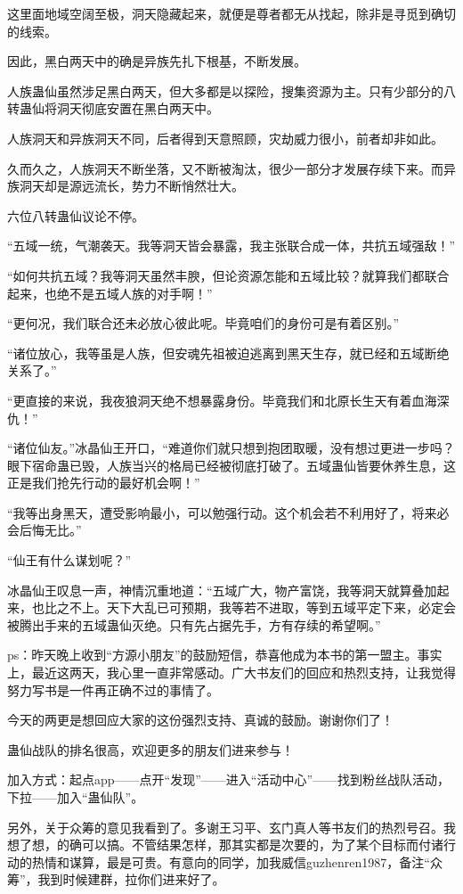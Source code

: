 \begin{this_body}
这里面地域空阔至极，洞天隐藏起来，就便是尊者都无从找起，除非是寻觅到确切的线索。

因此，黑白两天中的确是异族先扎下根基，不断发展。

人族蛊仙虽然涉足黑白两天，但大多都是以探险，搜集资源为主。只有少部分的八转蛊仙将洞天彻底安置在黑白两天中。

人族洞天和异族洞天不同，后者得到天意照顾，灾劫威力很小，前者却非如此。

久而久之，人族洞天不断坐落，又不断被淘汰，很少一部分才发展存续下来。而异族洞天却是源远流长，势力不断悄然壮大。

六位八转蛊仙议论不停。

“五域一统，气潮袭天。我等洞天皆会暴露，我主张联合成一体，共抗五域强敌！”

“如何共抗五域？我等洞天虽然丰腴，但论资源怎能和五域比较？就算我们都联合起来，也绝不是五域人族的对手啊！”

“更何况，我们联合还未必放心彼此呢。毕竟咱们的身份可是有着区别。”

“诸位放心，我等虽是人族，但安魂先祖被迫逃离到黑天生存，就已经和五域断绝关系了。”

“更直接的来说，我夜狼洞天绝不想暴露身份。毕竟我们和北原长生天有着血海深仇！”

“诸位仙友。”冰晶仙王开口，“难道你们就只想到抱团取暖，没有想过更进一步吗？眼下宿命蛊已毁，人族当兴的格局已经被彻底打破了。五域蛊仙皆要休养生息，这正是我们抢先行动的最好机会啊！”

“我等出身黑天，遭受影响最小，可以勉强行动。这个机会若不利用好了，将来必会后悔无比。”

“仙王有什么谋划呢？”

冰晶仙王叹息一声，神情沉重地道：“五域广大，物产富饶，我等洞天就算叠加起来，也比之不上。天下大乱已可预期，我等若不进取，等到五域平定下来，必定会被腾出手来的五域蛊仙灭绝。只有先占据先手，方有存续的希望啊。”

ps：昨天晚上收到“方源小朋友”的鼓励短信，恭喜他成为本书的第一盟主。事实上，最近这两天，我心里一直非常感动。广大书友们的回应和热烈支持，让我觉得努力写书是一件再正确不过的事情了。

今天的两更是想回应大家的这份强烈支持、真诚的鼓励。谢谢你们了！

蛊仙战队的排名很高，欢迎更多的朋友们进来参与！

加入方式：起点app——点开“发现”——进入“活动中心”——找到粉丝战队活动，下拉——加入“蛊仙队”。

另外，关于众筹的意见我看到了。多谢王习平、玄门真人等书友们的热烈号召。我想了想，的确可以搞。不管结果怎样，那其实都是次要的，为了某个目标而付诸行动的热情和谋算，最是可贵。有意向的同学，加我威信guzhenren1987，备注“众筹”，我到时候建群，拉你们进来好了。

\end{this_body}

